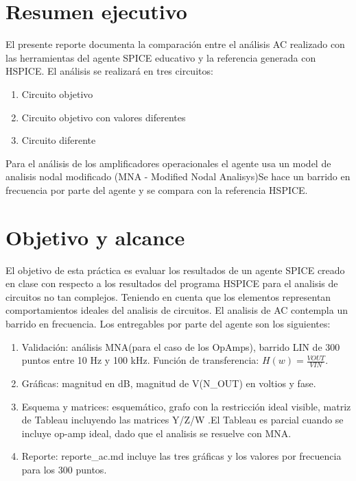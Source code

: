 \section*{Resumen ejecutivo}
El presente reporte documenta la comparación entre el análisis AC realizado con las herramientas del agente SPICE educativo y la referencia generada con HSPICE. El análisis se realizará en tres circuitos: 
\begin{enumerate}
	\item Circuito objetivo 
	\item Circuito objetivo con valores diferentes 
	\item Circuito diferente
\end{enumerate}

Para el análisis de los amplificadores operacionales el agente usa un model de analisis nodal modificado (MNA - Modified Nodal Analisys)Se hace un barrido en frecuencia por parte del agente y se compara con la referencia HSPICE.

\section{Objetivo y alcance}
El objetivo de esta práctica es evaluar los resultados de un agente SPICE creado en clase con respecto a los resultados del programa HSPICE para el analisis de circuitos no tan complejos. Teniendo en cuenta que los elementos representan comportamientos ideales del analisis de circuitos. El analisis de AC contempla un barrido en frecuencia.
Los entregables por parte del agente son los siguientes:

\begin{enumerate}
	\item Validación: análisis MNA(para el caso de los OpAmps), barrido LIN de 300 puntos entre 10 Hz y 100 kHz. Función de transferencia: $H(w)= \frac{VOUT}{VIN}$.
	\item Gráficas: magnitud en dB, magnitud de V(N\_OUT) en voltios y fase.
	\item Esquema y matrices: esquemático, grafo con la restricción ideal visible, matriz de Tableau incluyendo las matrices Y/Z/W .El Tableau es parcial cuando se incluye op-amp ideal, dado que el analisis se resuelve con MNA.
	\item Reporte: reporte\_ac.md incluye las tres gráficas y los valores por frecuencia para los 300 puntos.
\end{enumerate}
